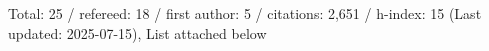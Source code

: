 Total: 25 / refereed: 18 / first author: 5 / citations: 2,651 / h-index: 15 (Last updated: 2025-07-15), List attached below